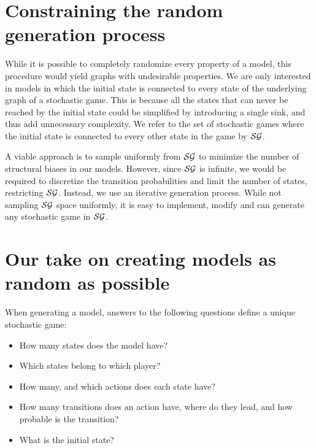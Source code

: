 
\section{Constraining the random generation process}
While it is possible to completely randomize every property of a model, this procedure would yield graphs with undesirable properties. 
We are only interested in models in which the initial state is connected to every state of the underlying graph of a stochastic game. 
This is because all the states that can never be reached by the initial state could be simplified by introducing a single sink, and thus add unnecessary complexity.
We refer to the set of stochastic games where the initial state is connected to every other state in the game by $\mathcal{SG}$.

A viable approach is to sample uniformly from $\mathcal{SG}$ to minimize the number of structural biases in our models.
However, since $\mathcal{SG}$ is infinite, we would be required to discretize the transition probabilities and limit the number of states,
restricting $\mathcal{SG}$.
Instead, we use an iterative generation process.
While not sampling $\mathcal{SG}$ space uniformly, it is easy to implement, modify and can generate any stochastic game in $\mathcal{SG}$.

\section{Our take on creating models as random as possible} \label{sec:randomGenAlgo}
When generating a model, answers to the following questions define a unique stochastic game:
\begin{itemize}
    \item How many states does the model have?
    \item Which states belong to which player?
    \item How many, and which actions does each state have?
    \item How many transitions does an action have, where do they lead, and how probable is the transition?
    \item What is the initial state?
\end{itemize}

